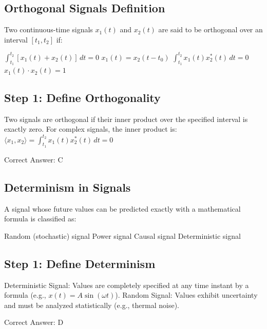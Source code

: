 \clearpage

\subsection{Orthogonal Signals Definition}

Two continuous-time signals $x_1(t)$ and $x_2(t)$ are said to be orthogonal over an interval $[t_1, t_2]$ if:

\begin{choices}
    \choice $\int_{t_1}^{t_2} [x_1(t) + x_2(t)]\, dt = 0$
    \choice $x_1(t) = x_2(t - t_0)$
    \correctchoice $\int_{t_1}^{t_2} x_1(t) x_2^*(t)\, dt = 0$
    \choice $x_1(t) \cdot x_2(t) = 1$
\end{choices}

\begin{solution}

\subsection*{Step 1: Define Orthogonality}
Two signals are orthogonal if their inner product over the specified interval is exactly zero. For complex signals, the inner product is:
$\langle x_1, x_2 \rangle = \int_{t_1}^{t_2} x_1(t) x_2^*(t)\, dt = 0$

Correct Answer: C
\end{solution}

\clearpage

\subsection{Determinism in Signals}

A signal whose future values can be predicted exactly with a mathematical formula is classified as:

\begin{choices}
    \choice Random (stochastic) signal
    \choice Power signal
    \choice Causal signal
    \correctchoice Deterministic signal
\end{choices}

\begin{solution}

\subsection*{Step 1: Define Determinism}
Deterministic Signal: Values are completely specified at any time instant by a formula (e.g., $x(t) = A \sin(\omega t)$).
Random Signal: Values exhibit uncertainty and must be analyzed statistically (e.g., thermal noise).

Correct Answer: D
\end{solution}

